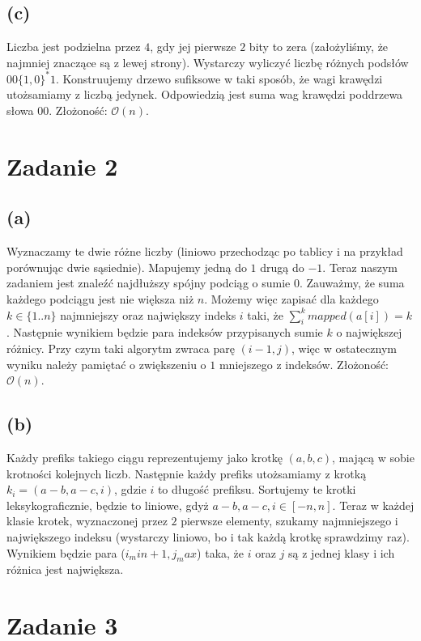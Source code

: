 \documentclass[12pt, a4paper]{article}
\newcommand{\MCALO}{\mathcal{O}}
\begin{document}
\subsection*{(c)}
Liczba jest podzielna przez $4$, gdy jej pierwsze $2$ bity to zera
(założyliśmy, że najmniej znaczące są z lewej strony). Wystarczy wyliczyć
liczbę różnych podsłów $00\{1,0\}^*1$. Konstruujemy drzewo sufiksowe w taki
sposób, że wagi krawędzi utożsamiamy z liczbą jedynek. Odpowiedzią jest suma
wag krawędzi poddrzewa słowa $00$.
Złożoność: $\MCALO(n)$.

\section*{Zadanie 2}
\subsection*{(a)}
Wyznaczamy te dwie różne liczby (liniowo przechodząc po tablicy i na przykład porównując dwie sąsiednie).
Mapujemy jedną do $1$ drugą do $-1$. Teraz naszym zadaniem jest znaleźć najdłuższy spójny podciąg
o sumie $0$. Zauważmy, że suma każdego podciągu jest nie większa niż $n$. Możemy więc zapisać
dla każdego $k \in \{1..n\}$ najmniejszy oraz największy indeks $i$ taki, że $\sum_{i}^k mapped(a[i]) = k$.
Następnie wynikiem będzie para indeksów przypisanych sumie $k$ o największej różnicy.
Przy czym taki algorytm zwraca parę $(i-1, j)$, więc w ostatecznym wyniku należy pamiętać o zwiększeniu
o $1$ mniejszego z indeksów.
Złożoność: $\MCALO(n)$.

\subsection*{(b)}
Każdy prefiks takiego ciągu reprezentujemy jako krotkę $(a, b, c)$, mającą
w sobie krotności kolejnych liczb. Następnie każdy prefiks utożsamiamy z krotką
$k_i = (a-b, a-c, i)$, gdzie $i$ to długość prefiksu. Sortujemy te krotki
leksykograficznie, będzie to liniowe, gdyż $a-b, a-c, i \in [-n, n]$. Teraz
w każdej klasie krotek, wyznaczonej przez $2$ pierwsze elementy, szukamy
najmniejszego i największego indeksu (wystarczy liniowo, bo i tak każdą krotkę
sprawdzimy raz). Wynikiem będzie para ($i_min + 1, j_max$) taka, że $i$ oraz
$j$ są z jednej klasy i ich różnica jest największa.

\section*{Zadanie 3}
\end{document}
